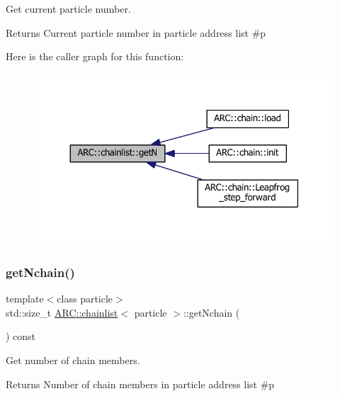 Get current particle number. 

\begin{DoxyReturn}{Returns}
Current particle number in particle address list \#p 
\end{DoxyReturn}
Here is the caller graph for this function\+:
\nopagebreak
\begin{figure}[H]
\begin{center}
\leavevmode
\includegraphics[width=330pt]{classARC_1_1chainlist_a9b45780f42626b14e3a2fd7b5de4bf32_icgraph}
\end{center}
\end{figure}
\hypertarget{classARC_1_1chainlist_aa1bd568975acc3bab3410e4fc9cb4d94}{}\label{classARC_1_1chainlist_aa1bd568975acc3bab3410e4fc9cb4d94} 
\subsubsection{\texorpdfstring{get\+Nchain()}{getNchain()}}
{\footnotesize\ttfamily template$<$class particle$>$ \\
std\+::size\+\_\+t \hyperlink{classARC_1_1chainlist}{A\+R\+C\+::chainlist}$<$ particle $>$\+::get\+Nchain (\begin{DoxyParamCaption}{ }\end{DoxyParamCaption}) const\hspace{0.3cm}{\ttfamily [inline]}}



Get number of chain members. 

\begin{DoxyReturn}{Returns}
Number of chain members in particle address list \#p 
\end{DoxyReturn}
\hypertarget{classARC_1_1chainlist_a2ba52f639df8bbd830b669c78c954131}{}\label{classARC_1_1chainlist_a2ba52f639df8bbd830b669c78c954131} 
